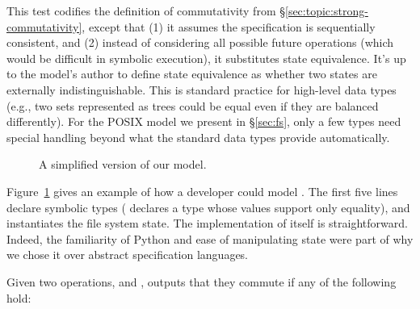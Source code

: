 This test codifies the definition of \SRI commutativity from
\S\ref{sec:topic:strong-commutativity},
except that (1) it assumes the specification is sequentially consistent,
and (2) instead of considering all possible future operations
(which would be difficult in symbolic execution), it substitutes state
equivalence.  It's up to the model's author to define state equivalence
as whether two states are externally indistinguishable.  This is
standard practice for high-level data types (e.g., two sets represented
as trees could be equal even if they are balanced differently).  For the
POSIX model we present in \S\ref{sec:fs}, only a few types need special
handling beyond
what the standard data types provide automatically.  \cbend

\begin{figure}
\begin{small}

\end{small}
\caption{A simplified version of our  model.
}
\label{fig:rename-spec}
\end{figure}

Figure~\ref{fig:rename-spec} gives an example of how a developer could
model .  \cbstart The first five lines declare symbolic
types ( declares a type whose values support only
equality), and  instantiates the file system state.  The
implementation of  itself is straightforward.  Indeed, the
familiarity of Python and ease of manipulating state were part of why we
chose it over abstract specification languages. \cbend

Given two
 operations,  and ,
\analyzer outputs that they commute if any of the following hold:

